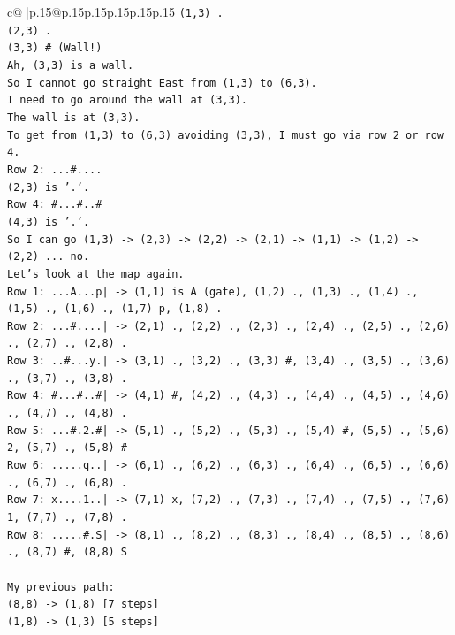\documentclass{article}
\begin{document}
{\begin{supertabular}{c@{$\;$}|p{.15\linewidth}@{}p{.15\linewidth}p{.15\linewidth}p{.15\linewidth}p{.15\linewidth}p{.15\linewidth}}
{{{\texttt{(1,3) .} \\
\texttt{(2,3) .} \\
\texttt{(3,3) \# (Wall!)} \\
\texttt{Ah, (3,3) is a wall.} \\
\texttt{So I cannot go straight East from (1,3) to (6,3).} \\
\texttt{I need to go around the wall at (3,3).} \\
\texttt{The wall is at (3,3).} \\
\texttt{To get from (1,3) to (6,3) avoiding (3,3), I must go via row 2 or row 4.} \\
\texttt{Row 2: ...\#....} \\
\texttt{(2,3) is '.'.} \\
\texttt{Row 4: \#...\#..\#} \\
\texttt{(4,3) is '.'.} \\
\texttt{So I can go (1,3) {-}> (2,3) {-}> (2,2) {-}> (2,1) {-}> (1,1) {-}> (1,2) {-}> (2,2) ... no.} \\
\texttt{Let's look at the map again.} \\
\texttt{Row 1: ...A...p| {-}> (1,1) is A (gate), (1,2) ., (1,3) ., (1,4) ., (1,5) ., (1,6) ., (1,7) p, (1,8) .} \\
\texttt{Row 2: ...\#....| {-}> (2,1) ., (2,2) ., (2,3) ., (2,4) ., (2,5) ., (2,6) ., (2,7) ., (2,8) .} \\
\texttt{Row 3: ..\#...y.| {-}> (3,1) ., (3,2) ., (3,3) \#, (3,4) ., (3,5) ., (3,6) ., (3,7) ., (3,8) .} \\
\texttt{Row 4: \#...\#..\#| {-}> (4,1) \#, (4,2) ., (4,3) ., (4,4) ., (4,5) ., (4,6) ., (4,7) ., (4,8) .} \\
\texttt{Row 5: ...\#.2.\#| {-}> (5,1) ., (5,2) ., (5,3) ., (5,4) \#, (5,5) ., (5,6) 2, (5,7) ., (5,8) \#} \\
\texttt{Row 6: .....q..| {-}> (6,1) ., (6,2) ., (6,3) ., (6,4) ., (6,5) ., (6,6) ., (6,7) ., (6,8) .} \\
\texttt{Row 7: x....1..| {-}> (7,1) x, (7,2) ., (7,3) ., (7,4) ., (7,5) ., (7,6) 1, (7,7) ., (7,8) .} \\
\texttt{Row 8: .....\#.S| {-}> (8,1) ., (8,2) ., (8,3) ., (8,4) ., (8,5) ., (8,6) ., (8,7) \#, (8,8) S} \\
\\ 
\texttt{My previous path:} \\
\texttt{(8,8) {-}> (1,8) {[}7 steps{]}} \\
\texttt{(1,8) {-}> (1,3) {[}5 steps{]}} \\
}}}
\end{supertabular}}
\end{document}
